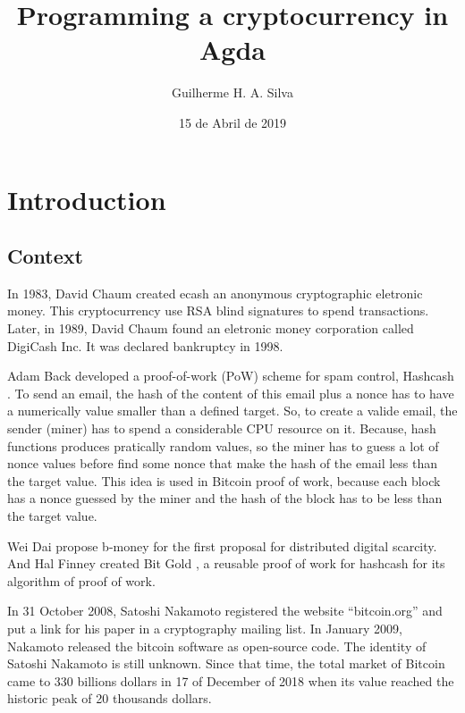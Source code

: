 \documentclass[12pt]{article}
\title{Programming a cryptocurrency in Agda}
\author{Guilherme H. A. Silva}
\date{15 de Abril de 2019}
\begin{document}

\firstpage


\tableofcontents
\pagebreak

\renewcommand{\thesection}{\arabic{section}}
\section{Introduction}

\subsection{Context}

In 1983, David Chaum created ecash \cite{panurach1996money} an anonymous cryptographic eletronic money.
This cryptocurrency use RSA blind signatures \cite{chaum1983blind} to spend transactions.
Later, in 1989, David Chaum found an eletronic money corporation called DigiCash Inc.
It was declared bankruptcy in 1998.

Adam Back developed a proof-of-work (PoW) scheme for spam control, Hashcash \cite{back2002hashcash}.
To send an email, the hash of the content of this email plus a nonce has to have a numerically value
smaller than a defined target.
So, to create a valide email, the sender (miner) has to spend a considerable CPU resource on it.
Because, hash functions produces pratically random values, so the miner has to guess a lot of nonce
values before find some nonce that make the hash of the email less than the target value.
This idea is used in Bitcoin proof of work, because each block has a nonce guessed by the miner and
the hash of the block has to be less than the target value.

Wei Dai propose b-money \cite{dai1998b} for the first proposal for distributed digital scarcity.
And Hal Finney created Bit Gold \cite{wallace2011rise}, a reusable proof of work for hashcash for
its algorithm of proof of work.

In 31 October 2008, Satoshi Nakamoto registered the website ``bitcoin.org'' and put a link for his
paper \cite{nakamoto2008bitcoin} in a cryptography mailing list.
In January 2009, Nakamoto released the bitcoin software as open-source code.
The identity of Satoshi Nakamoto is still unknown.
Since that time, the total market of Bitcoin came to 330 billions dollars in 17 of December of 2018
when its value reached the historic peak of 20 thousands dollars.
\end{document}
